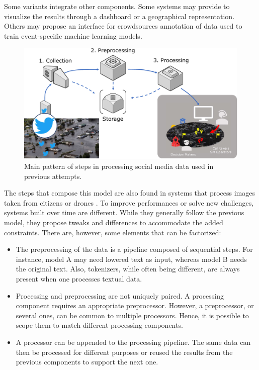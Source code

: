 Some variants integrate other components.
Some systems may provide to visualize the results through a dashboard or a geographical representation.
Others may propose an interface for crowdsources annotation of data used to train event-specific machine learning models.

\begin{figure}[htb]
    \centering
    \includegraphics[width=\textwidth]{figures/chap-5/social-media-processing.pdf}
    \caption{Main pattern of steps in processing social media data used in previous attempts.}
    \label{system:sm-processing}
\end{figure}

The steps that compose this model are also found in systems that process images taken from citizens \parencite{alamImage4ActOnlineSocial2017} or drones \parencite{fanDisasterCityDigital2021}.
To improve performances or solve new challenges, systems built over time are different.
While they generally follow the previous model, they propose tweaks and differences to accommodate the added constraints.
There are, however, some elements that can be factorized:

\begin{itemize}
    \item The preprocessing of the data is a pipeline composed of sequential steps.
          For instance, model A may need lowered text as input, whereas model B needs the original text.
          Also, tokenizers, while often being different, are always present when one processes textual data.
    \item Processing and preprocessing are not uniquely paired.
          A processing component requires an appropriate preprocessor.
          However, a preprocessor, or several ones, can be common to multiple processors.
          Hence, it is possible to scope them to match different processing components.
    \item A processor can be appended to the processing pipeline.
          The same data can then be processed for different purposes or reused the results from the previous components to support the next one.
\end{itemize}

